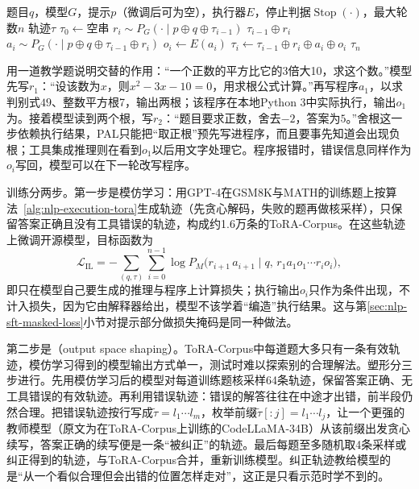\begin{algorithm}[工具集成推理的交替生成]
  \label{alg:nlp-execution-tora}
  \begin{algorithmic}[1]
    \Require 题目$q$，模型$G$，提示$p$（微调后可为空），执行器$E$，停止判据$\operatorname{Stop}(\cdot)$，最大轮数$n$
    \Ensure 轨迹$\tau$
    \State $\tau_0\gets$空串
      \State $r_i\sim P_G(\cdot\mid p\oplus q\oplus\tau_{i-1})$ 
       
        \State \Return $\tau_{i-1}\oplus r_i$
      \EndIf
      \State $a_i\sim P_G(\cdot\mid p\oplus q\oplus\tau_{i-1}\oplus r_i)$ 
      \State $o_i\gets E(a_i)$ 
      \State $\tau_i\gets\tau_{i-1}\oplus r_i\oplus a_i\oplus o_i$
    \EndFor
    \State \Return $\tau_n$ 
  \end{algorithmic}
\end{algorithm}

用一道教学题说明交替的作用：“一个正数的平方比它的3倍大10，求这个数。”模型先写$r_1$：“设该数为$x$，则$x^2-3x-10=0$，用求根公式计算。”再写程序$a_1$，以求判别式$49$、整数平方根7，输出两根；该程序在本地Python 3中实际执行，输出$o_1$为\code{[-2, 5]}。接着模型读到两个根，写$r_2$：“题目要求正数，舍去$-2$，答案为$\boxed{5}$。”舍根这一步依赖执行结果，PAL只能把“取正根”预先写进程序，而且要事先知道会出现负根；工具集成推理则在看到$o_1$以后用文字处理它。程序报错时，错误信息同样作为$o_i$写回，模型可以在下一轮改写程序。

训练分两步。第一步是模仿学习：用GPT-4在GSM8K与MATH的训练题上按算法~\ref{alg:nlp-execution-tora}生成轨迹（先贪心解码，失败的题再做核采样），只保留答案正确且没有工具错误的轨迹，构成约1.6万条的ToRA-Corpus。在这些轨迹上微调开源模型，目标函数为
\begin{equation}
  \mathcal{L}_{\mathrm{IL}}=-\sum_{(q,\tau)}\sum_{i=0}^{n-1}\log P_{M}\bigl(r_{i+1}\,a_{i+1}\mid q,\,r_1a_1o_1\cdots r_io_i\bigr),
  \label{eq:nlp-execution-tora-loss}
\end{equation}
即只在模型自己要生成的推理与程序上计算损失；执行输出$o_i$只作为条件出现，不计入损失，因为它由解释器给出，模型不该学着“编造”执行结果。这与第\ref{sec:nlp-sft-masked-loss}小节对提示部分做损失掩码是同一种做法。

第二步是（output space shaping）。ToRA-Corpus中每道题大多只有一条有效轨迹，模仿学习得到的模型输出方式单一，测试时难以探索别的合理解法。塑形分三步进行。先用模仿学习后的模型对每道训练题核采样64条轨迹，保留答案正确、无工具错误的有效轨迹。再利用错误轨迹：错误的解答往往在中途才出错，前半段仍然合理。把错误轨迹按行写成$\tilde\tau=l_1\cdots l_m$，枚举前缀$\tilde\tau[:j]=l_1\cdots l_j$，让一个更强的教师模型（原文为在ToRA-Corpus上训练的CodeLLaMA-34B）从该前缀出发贪心续写，答案正确的续写便是一条“被纠正”的轨迹。最后每题至多随机取4条采样或纠正得到的轨迹，与ToRA-Corpus合并，重新训练模型。纠正轨迹教给模型的是“从一个看似合理但会出错的位置怎样走对”，这正是只看示范时学不到的。

